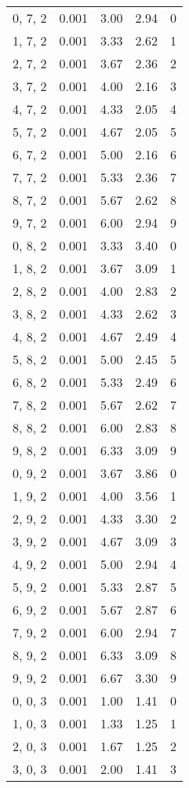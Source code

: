 \documentclass[12pt]{article}
\begin{document}
\begin{tabular}{c || c || c | c | c}
0, 7, 2 & 0.001 & 3.00 & 2.94 & 0 \\
1, 7, 2 & 0.001 & 3.33 & 2.62 & 1 \\
2, 7, 2 & 0.001 & 3.67 & 2.36 & 2 \\
3, 7, 2 & 0.001 & 4.00 & 2.16 & 3 \\
4, 7, 2 & 0.001 & 4.33 & 2.05 & 4 \\
5, 7, 2 & 0.001 & 4.67 & 2.05 & 5 \\
6, 7, 2 & 0.001 & 5.00 & 2.16 & 6 \\
7, 7, 2 & 0.001 & 5.33 & 2.36 & 7 \\
8, 7, 2 & 0.001 & 5.67 & 2.62 & 8 \\
9, 7, 2 & 0.001 & 6.00 & 2.94 & 9 \\
0, 8, 2 & 0.001 & 3.33 & 3.40 & 0 \\
1, 8, 2 & 0.001 & 3.67 & 3.09 & 1 \\
2, 8, 2 & 0.001 & 4.00 & 2.83 & 2 \\
3, 8, 2 & 0.001 & 4.33 & 2.62 & 3 \\
4, 8, 2 & 0.001 & 4.67 & 2.49 & 4 \\
5, 8, 2 & 0.001 & 5.00 & 2.45 & 5 \\
6, 8, 2 & 0.001 & 5.33 & 2.49 & 6 \\
7, 8, 2 & 0.001 & 5.67 & 2.62 & 7 \\
8, 8, 2 & 0.001 & 6.00 & 2.83 & 8 \\
9, 8, 2 & 0.001 & 6.33 & 3.09 & 9 \\
0, 9, 2 & 0.001 & 3.67 & 3.86 & 0 \\
1, 9, 2 & 0.001 & 4.00 & 3.56 & 1 \\
2, 9, 2 & 0.001 & 4.33 & 3.30 & 2 \\
3, 9, 2 & 0.001 & 4.67 & 3.09 & 3 \\
4, 9, 2 & 0.001 & 5.00 & 2.94 & 4 \\
5, 9, 2 & 0.001 & 5.33 & 2.87 & 5 \\
6, 9, 2 & 0.001 & 5.67 & 2.87 & 6 \\
7, 9, 2 & 0.001 & 6.00 & 2.94 & 7 \\
8, 9, 2 & 0.001 & 6.33 & 3.09 & 8 \\
9, 9, 2 & 0.001 & 6.67 & 3.30 & 9 \\
0, 0, 3 & 0.001 & 1.00 & 1.41 & 0 \\
1, 0, 3 & 0.001 & 1.33 & 1.25 & 1 \\
2, 0, 3 & 0.001 & 1.67 & 1.25 & 2 \\
3, 0, 3 & 0.001 & 2.00 & 1.41 & 3 \\

\end{tabular}
\end{document}
